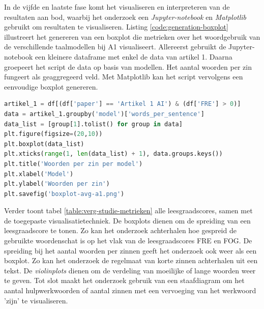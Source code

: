 In de vijfde en laatste fase komt het visualiseren en interpreteren van de resultaten aan bod, waarbij het onderzoek een \textit{Jupyter-notebook} en \textit{Matplotlib} gebruikt om resultaten te visualiseren. Listing \ref{code:generation-boxplot} illustreert het genereren van een boxplot die metrieken over het woordgebruik van de verschillende taalmodellen bij A1 visualiseert. Allereerst gebruikt de Jupyter-notebook een kleinere dataframe met enkel de data van artikel 1. Daarna groepeert het script de data op basis van modellen. Het aantal woorden per zin fungeert als geaggregeerd veld. Met Matplotlib kan het script vervolgens een eenvoudige boxplot genereren.


\begin{lstlisting}[language=Python, caption={Code om een boxplot voor het aantal woorden per zin te genereren.}, label={code:generation-boxplot}]	
artikel_1 = df[(df['paper'] == 'Artikel 1 AI') & (df['FRE'] > 0)]
data = artikel_1.groupby('model')['words_per_sentence']
data_list = [group[1].tolist() for group in data]
plt.figure(figsize=(20,10))
plt.boxplot(data_list)
plt.xticks(range(1, len(data_list) + 1), data.groups.keys())
plt.title('Woorden per zin per model')
plt.xlabel('Model')
plt.ylabel('Woorden per zin')
plt.savefig('boxplot-avg-a1.png')
\end{lstlisting}

Verder toont tabel \ref{table:verg-studie-metrieken} alle leesgraadscores, samen met de toegepaste visualisatietechniek. De boxplots dienen om de spreiding van een leesgraadscore te tonen. Zo kan het onderzoek achterhalen hoe gespreid de gebruikte woordenschat is op het vlak van de leesgraadscores FRE en FOG. De spreiding bij het aantal woorden per zinnen geeft het onderzoek ook weer als een boxplot. Zo kan het onderzoek de regelmaat van korte zinnen achterhalen uit een tekst. De \textit{violinplots} dienen om de verdeling van moeilijke of lange woorden weer te geven. Tot slot maakt het onderzoek gebruik van een staafdiagram om het aantal hulpwerkwoorden of aantal zinnen met een vervoeging van het werkwoord 'zijn' te visualiseren.

